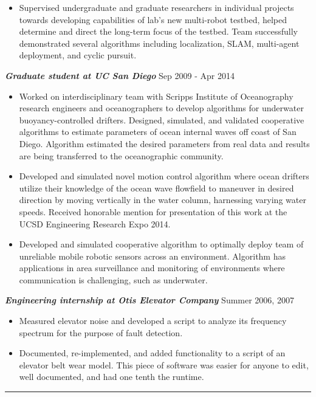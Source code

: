 \documentclass{res}
\begin{document}
\begin{resume}
\begin{itemize}
\item Supervised undergraduate and graduate researchers in individual projects towards developing capabilities of lab's new multi-robot testbed, helped determine and direct the long-term focus of the testbed.  Team successfully demonstrated several algorithms including localization, SLAM, multi-agent deployment, and cyclic pursuit. 
\end{itemize}
\vspace*{-1ex}
{\sl  \bf Graduate student at UC San Diego} \hfill Sep 2009 - Apr 2014 
\begin{itemize}
\item Worked on interdisciplinary team with Scripps Institute of Oceanography research engineers and oceanographers to develop algorithms for underwater buoyancy-controlled drifters. Designed, simulated, and validated cooperative algorithms to estimate parameters of ocean internal waves off coast of San Diego.  Algorithm estimated the desired parameters from real data and results are being transferred to the oceanographic community.
\item Developed and simulated novel motion control algorithm where ocean drifters utilize their knowledge of the ocean wave flowfield to maneuver in desired direction by moving vertically in the water column, harnessing varying water speeds. Received honorable mention for presentation of this work at the UCSD Engineering Research Expo 2014.
\item Developed and simulated cooperative algorithm to optimally deploy team of unreliable mobile robotic sensors across an environment. Algorithm has applications in area surveillance and monitoring of environments where communication is challenging, such as underwater. 
\end{itemize}
\vspace*{-2ex}
 {\sl \bf Engineering internship at Otis Elevator Company} \hfill Summer 2006, 2007 
\begin{itemize}
\item Measured elevator noise and developed a script to analyze its frequency spectrum for the purpose of fault detection. 
\item Documented, re-implemented, and added functionality to a script of an elevator belt wear model.  This piece of software was easier for anyone to edit, well documented, and had one tenth the runtime.
\end{itemize}
%
 \vspace*{-3ex}
\hspace{-8.5ex}\rule{16.5cm}{0.4pt}
 \vspace*{-3ex}

\end{resume}
\end{document}
